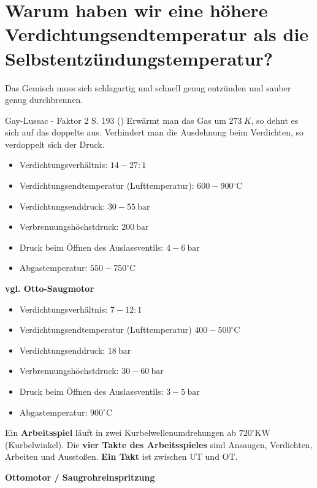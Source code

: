\section{Warum haben wir eine höhere Verdichtungsendtemperatur als die
Selbstentzündungstemperatur?}\label{warum-haben-wir-eine-hoehere-verdichtungsendtemperatur-als-die-selbstentzuendungstemperatur}

Das Gemisch muss sich schlagartig und schnell genug entzünden und sauber
genug durchbrennen.

Gay-Lussac - Faktor 2 S. 193 (\textcite{brand:2020:fachkundeKfz}) Erwärmt
man das Gas um $273~K$, so dehnt es sich auf das doppelte aus.
Verhindert man die Ausdehnung beim Verdichten, so verdoppelt sich der
Druck.

\begin{itemize}
\item
  Verdichtungsverhältnis: $14 - 27:1$
\item
  Verdichtungsendtemperatur (Lufttemperatur):
  $600 - 900^\circ\text{C}$
\item
  Verdichtungsenddruck: $30 - 55~\text{bar}$
\item
  Verbrennungshöchstdruck: $200~\text{bar}$
\item
  Druck beim Öffnen des Auslassventils: $4 - 6~\text{bar}$
\item
  Abgastemperatur: $550 - 750^\circ\text{C}$
\end{itemize}

\textbf{vgl. Otto-Saugmotor}

\begin{itemize}
\item
  Verdichtungsverhältnis: $7-12:1$
\item
  Verdichtungsendtemperatur (Lufttemperatur) $400 - 500^\circ\text{C}$
\item
  Verdichtungsenddruck: $18~\text{bar}$
\item
  Verbrennungshöchstdruck: $30 - 60~\text{bar}$
\item
  Druck beim Öffnen des Auslassventils: $3 - 5~\text{bar}$
\item
  Abgastemperatur: $900^\circ\text{C}$
\end{itemize}

Ein \textbf{Arbeitsspiel} läuft in zwei Kurbelwellenumdrehungen ab
$720^\circ\text{KW}$ (Kurbelwinkel). Die \textbf{vier Takte des
Arbeitsspieles} sind Ansaugen, Verdichten, Arbeiten und Ausstoßen.
\textbf{Ein Takt} ist zwischen UT und OT.

\textbf{Ottomotor / Saugrohreinspritzung}

